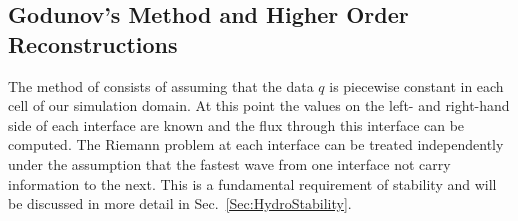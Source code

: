
\subsection{Godunov's Method and Higher Order Reconstructions}\label{Sec:HydroReconstruction}

The method of \citet{Godunov1959} consists of assuming that the data $q$ is piecewise constant in each cell of our simulation domain.
At this point the values on the left- and right-hand side of each interface are known and the flux through this interface can be computed.
The Riemann problem at each interface can be treated independently under the assumption that the fastest wave from one interface not carry information to the next.
This is a fundamental requirement of stability and will be discussed in more detail in Sec.~\ref{Sec:HydroStability}.

